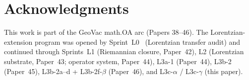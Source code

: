 \documentclass[11pt,a4paper]{article}
\theoremstyle{plain}
\theoremstyle{definition}
\begin{document}
\section*{Acknowledgments}

\noindent This work is part of the GeoVac math.OA arc (Papers
38--46). The Lorentzian-extension program was opened by
Sprint~L0~\cite{paper31} (Lorentzian transfer audit) and continued
through Sprints~L1 (Riemannian closure, Paper~42), L2 (Lorentzian
substrate, Paper~43; operator system, Paper~44), L3a-1 (Paper~44),
L3b-2 (Paper~45), L3b-2a--d + L3b-2f-$\beta$ (Paper~46), and L3c-$\alpha$
/ L3c-$\gamma$ (this paper).

\end{document}
